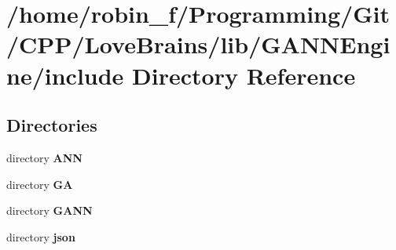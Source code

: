 \section{/home/robin\+\_\+f/\+Programming/\+Git/\+C\+P\+P/\+Love\+Brains/lib/\+G\+A\+N\+N\+Engine/include Directory Reference}
\label{dir_7cd5df000b04b8d5641521ece370834d}
\subsection*{Directories}
\begin{DoxyCompactItemize}
\item 
directory {\bf A\+N\+N}
\item 
directory {\bf G\+A}
\item 
directory {\bf G\+A\+N\+N}
\item 
directory {\bf json}
\end{DoxyCompactItemize}

